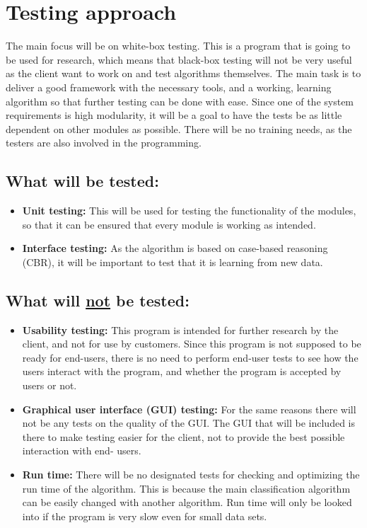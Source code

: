 \documentclass[12pt, fullpage, oneside]{report}
\begin{document}
	\section{Testing approach}
		The main focus will be on white-box testing. This is a program that is going to be used for research, which means that black-box testing will not be very useful as the client want to work on and test algorithms themselves. The main task is to deliver a good framework with the 				necessary tools, and a working, learning algorithm so that further testing can be done with ease. Since one of the system requirements is high modularity, it will be a goal to have the tests be as little dependent on other modules as possible. There will be no training needs, as the 				testers are also involved in the programming.

		\subsection*{What will be tested:}
			\begin{itemize}
				\renewcommand{\labelitemi}{$\bullet$}
					\item \textbf{Unit testing:} This will be used for testing the functionality of the modules, so that it can be ensured that every module is working as intended.
					\item \textbf{Interface testing:} As the algorithm is based on case-based reasoning (CBR), it will be important to test that it is learning from new data.
			\end{itemize}

		\subsection*{What will \underline{not} be tested:}
			\begin{itemize}
				\renewcommand{\labelitemi}{$\bullet$}
					\item \textbf{Usability testing:} This program is intended for further research by the client, and not for use by customers. Since this program is not supposed to be ready for end-users, there is no need to perform end-user tests to see how the users interact 								with the program, and whether the program is accepted by users or not.
					\item \textbf{Graphical user interface (GUI) testing:} For the same reasons there will not be any tests on the quality of the GUI. The GUI that will be included is there to make testing easier for the client, not to provide the best possible interaction with end-								users.
					\item \textbf{Run time:} There will be no designated tests for checking and optimizing the run time of the algorithm. This is because the main classification algorithm can be easily changed with another algorithm. Run time will only be looked into if the program is 								very slow even for small data sets.
			\end{itemize}
\end{document}
